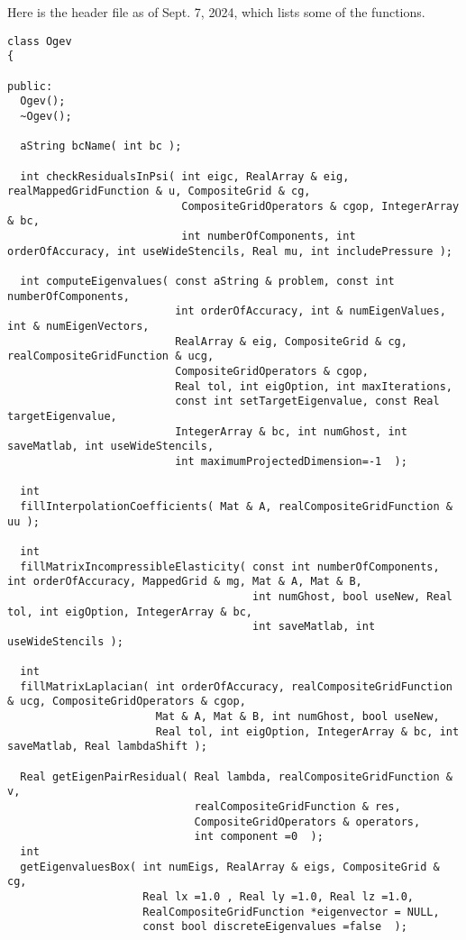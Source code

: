 \documentclass[preprint,11pt]{elsarticle}
\begin{document}
\mni
Here is the header file as of Sept. 7, 2024, which lists some of the functions.
\begin{Verbatim}[fontsize=\tiny]
class Ogev 
{

public:
  Ogev();
  ~Ogev();

  aString bcName( int bc );

  int checkResidualsInPsi( int eigc, RealArray & eig, realMappedGridFunction & u, CompositeGrid & cg,  
                           CompositeGridOperators & cgop, IntegerArray & bc, 
                           int numberOfComponents, int orderOfAccuracy, int useWideStencils, Real mu, int includePressure );  

  int computeEigenvalues( const aString & problem, const int numberOfComponents,
                          int orderOfAccuracy, int & numEigenValues, int & numEigenVectors, 
                          RealArray & eig, CompositeGrid & cg, realCompositeGridFunction & ucg, 
                          CompositeGridOperators & cgop, 
                          Real tol, int eigOption, int maxIterations,
                          const int setTargetEigenvalue, const Real targetEigenvalue,
                          IntegerArray & bc, int numGhost, int saveMatlab, int useWideStencils,
                          int maximumProjectedDimension=-1  );

  int 
  fillInterpolationCoefficients( Mat & A, realCompositeGridFunction & uu );

  int 
  fillMatrixIncompressibleElasticity( const int numberOfComponents, int orderOfAccuracy, MappedGrid & mg, Mat & A, Mat & B, 
                                      int numGhost, bool useNew, Real tol, int eigOption, IntegerArray & bc, 
                                      int saveMatlab, int useWideStencils );

  int 
  fillMatrixLaplacian( int orderOfAccuracy, realCompositeGridFunction & ucg, CompositeGridOperators & cgop, 
                       Mat & A, Mat & B, int numGhost, bool useNew, 
                       Real tol, int eigOption, IntegerArray & bc, int saveMatlab, Real lambdaShift );

  Real getEigenPairResidual( Real lambda, realCompositeGridFunction & v,
                             realCompositeGridFunction & res,  
                             CompositeGridOperators & operators, 
                             int component =0  );
  int 
  getEigenvaluesBox( int numEigs, RealArray & eigs, CompositeGrid & cg,
                     Real lx =1.0 , Real ly =1.0, Real lz =1.0,
                     RealCompositeGridFunction *eigenvector = NULL,
                     const bool discreteEigenvalues =false  );


\end{Verbatim}
\end{document}
